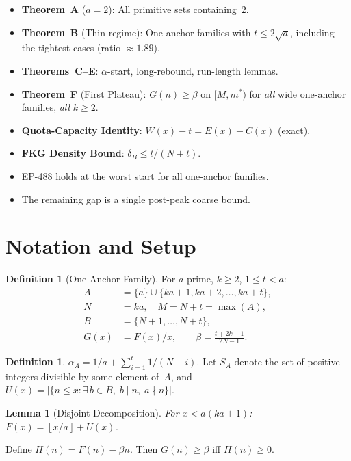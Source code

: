 \documentclass[11pt,a4paper]{article}
\newtheorem{lemma}[theorem]{Lemma}
\theoremstyle{definition}
\newtheorem{definition}[theorem]{Definition}
\newcommand{\floor}[1]{\left\lfloor #1 \right\rfloor}
\begin{document}
\begin{itemize}
\item \textbf{Theorem~A} ($a=2$): All primitive sets containing~$2$.
\item \textbf{Theorem~B} (Thin regime): One-anchor families with
$t \leq 2\sqrt{a}$, including the tightest cases (ratio $\approx 1.89$).
\item \textbf{Theorems~C--E}: $\alpha$-start, long-rebound, run-length lemmas.
\item \textbf{Theorem~F} (First Plateau): $G(n) \geq \beta$ on $[M, m^*)$
for \emph{all} wide one-anchor families, \emph{all} $k \geq 2$.
\item \textbf{Quota-Capacity Identity}: $W(x) - t = E(x) - C(x)$ (exact).
\item \textbf{FKG Density Bound}: $\delta_B \leq t/(N+t)$.
\item EP-488 holds at the worst start for all one-anchor families.
\item The remaining gap is a single post-peak coarse bound.
\end{itemize}

\section{Notation and Setup}

\begin{definition}[One-Anchor Family]
For $a$ prime, $k \geq 2$, $1 \leq t < a$:
\begin{align}
A &= \{a\} \cup \{ka+1, ka+2, \ldots, ka+t\}, \\
N &= ka, \quad M = N + t = \max(A), \\
B &= \{N+1, \ldots, N+t\}, \\
G(x) &= F(x)/x, \qquad \beta = \frac{t + 2k - 1}{2N - 1}.
\end{align}
\end{definition}

\begin{definition}
$\alpha_A = 1/a + \sum_{i=1}^{t} 1/(N+i)$. Let $S_A$ denote the set of
positive integers divisible by some element of~$A$, and
$U(x) = |\{n \leq x : \exists\, b \in B,\; b \mid n,\; a \nmid n\}|$.
\end{definition}

\begin{lemma}[Disjoint Decomposition]
For $x < a(ka+1)$: $F(x) = \floor{x/a} + U(x)$.
\end{lemma}

Define $H(n) = F(n) - \beta n$. Then $G(n) \geq \beta$ iff $H(n) \geq 0$.
\end{document}
